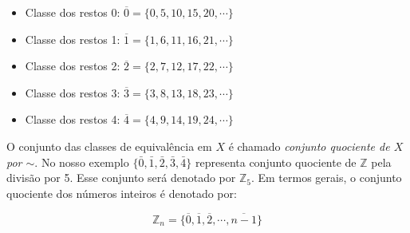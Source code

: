 	\begin{itemize}
		\item Classe dos restos 0: $\overline{0}=\{0, 5, 10, 15, 20, \cdots\}$
		\item Classe dos restos 1: $\overline{1}=\{1, 6, 11, 16, 21, \cdots\}$
		\item Classe dos restos 2: $\overline{2}=\{2, 7, 12, 17, 22, \cdots\}$
		\item Classe dos restos 3: $\overline{3}=\{3, 8, 13, 18, 23, \cdots\}$
		\item Classe dos restos 4: $\overline{4}=\{4, 9, 14, 19, 24, \cdots\}$
	\end{itemize}

O conjunto das classes de equival\^encia em $X$ \'e chamado \textit{conjunto quociente de $X$ por $\sim$}. No nosso exemplo $\{\bar{0}, \bar{1}, \bar{2}, \bar{3}, \bar{4}\}$ representa conjunto quociente de $\mathbb{Z}$ pela divis\~ao por 5. Esse conjunto ser\'a denotado por $\mathbb{Z}_{5}$. Em termos gerais, o conjunto quociente dos n\'umeros inteiros \'e denotado por:

$$\mathbb{Z}_{n}=\{\overline{0}, \overline{1}, \overline{2}, \cdots, \overline{n-1}\}$$ 